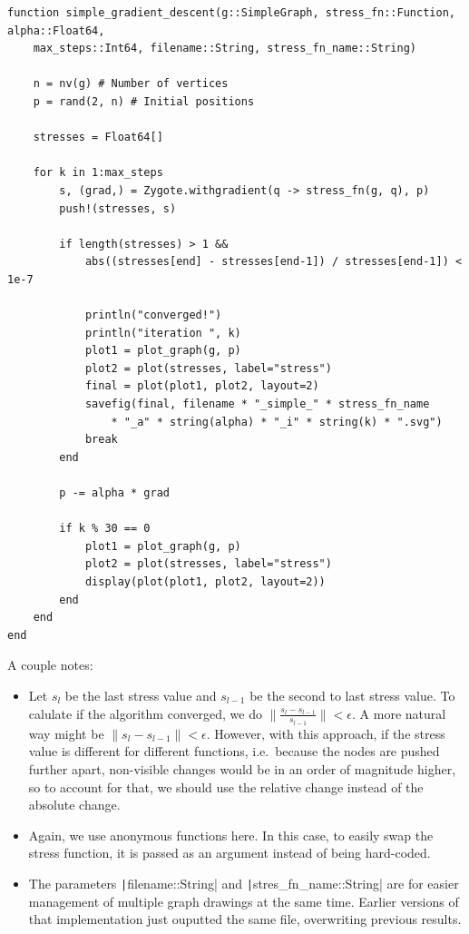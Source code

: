 \documentclass[12pt]{article}
\begin{document}
\begin{verbatim}
function simple_gradient_descent(g::SimpleGraph, stress_fn::Function, alpha::Float64,
    max_steps::Int64, filename::String, stress_fn_name::String)

    n = nv(g) # Number of vertices
    p = rand(2, n) # Initial positions

    stresses = Float64[]

    for k in 1:max_steps
        s, (grad,) = Zygote.withgradient(q -> stress_fn(g, q), p)
        push!(stresses, s)

        if length(stresses) > 1 &&
            abs((stresses[end] - stresses[end-1]) / stresses[end-1]) < 1e-7

            println("converged!")
            println("iteration ", k)
            plot1 = plot_graph(g, p)
            plot2 = plot(stresses, label="stress")
            final = plot(plot1, plot2, layout=2)
            savefig(final, filename * "_simple_" * stress_fn_name
                * "_a" * string(alpha) * "_i" * string(k) * ".svg")
            break
        end

        p -= alpha * grad

        if k % 30 == 0
            plot1 = plot_graph(g, p)
            plot2 = plot(stresses, label="stress")
            display(plot(plot1, plot2, layout=2))
        end
    end
end
\end{verbatim}

A couple notes:

\begin{itemize}
    \item Let $s_l$ be the last stress value and $s_{l-1}$ be the second to last stress value.
    To calulate if the algorithm converged, we do $\parallel \frac{s_l - s_{l-1}}{s_{l-1}} \parallel< \epsilon$.
    A more natural way might be $\parallel s_l - s_{l-1} \parallel < \epsilon$.
    However, with this approach, if the stress value is different for different functions, i.e.\ because the nodes are pushed further apart, non-visible changes would be in an order of magnitude higher,
    so to account for that, we should use the relative change instead of the absolute change.
    \item Again, we use anonymous functions here. In this case, to easily swap the stress function, it is passed as an argument instead of being hard-coded.
    \item The parameters \texttt|filename::String| and \texttt|stres_fn_name::String|
    are for easier management of multiple graph drawings at the same time. Earlier versions of that implementation just ouputted the same file, overwriting previous results.
\end{itemize}
\end{document}
